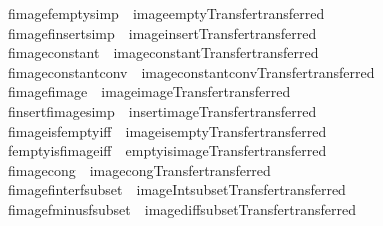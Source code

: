\begin{isabellebody}
\isamarkupfalse%
\ fimage{\isacharunderscore}fempty{\isacharbrackleft}simp{\isacharbrackright}\ {\isacharequal}\ image{\isacharunderscore}empty{\isacharbrackleft}Transfer{\isachardot}transferred{\isacharbrackright}\isanewline
{}\isamarkupfalse%
\ fimage{\isacharunderscore}finsert{\isacharbrackleft}simp{\isacharbrackright}\ {\isacharequal}\ image{\isacharunderscore}insert{\isacharbrackleft}Transfer{\isachardot}transferred{\isacharbrackright}\isanewline
{}\isamarkupfalse%
\ fimage{\isacharunderscore}constant\ {\isacharequal}\ image{\isacharunderscore}constant{\isacharbrackleft}Transfer{\isachardot}transferred{\isacharbrackright}\isanewline
{}\isamarkupfalse%
\ fimage{\isacharunderscore}constant{\isacharunderscore}conv\ {\isacharequal}\ image{\isacharunderscore}constant{\isacharunderscore}conv{\isacharbrackleft}Transfer{\isachardot}transferred{\isacharbrackright}\isanewline
{}\isamarkupfalse%
\ fimage{\isacharunderscore}fimage\ {\isacharequal}\ image{\isacharunderscore}image{\isacharbrackleft}Transfer{\isachardot}transferred{\isacharbrackright}\isanewline
{}\isamarkupfalse%
\ finsert{\isacharunderscore}fimage{\isacharbrackleft}simp{\isacharbrackright}\ {\isacharequal}\ insert{\isacharunderscore}image{\isacharbrackleft}Transfer{\isachardot}transferred{\isacharbrackright}\isanewline
{}\isamarkupfalse%
\ fimage{\isacharunderscore}is{\isacharunderscore}fempty{\isacharbrackleft}iff{\isacharbrackright}\ {\isacharequal}\ image{\isacharunderscore}is{\isacharunderscore}empty{\isacharbrackleft}Transfer{\isachardot}transferred{\isacharbrackright}\isanewline
{}\isamarkupfalse%
\ fempty{\isacharunderscore}is{\isacharunderscore}fimage{\isacharbrackleft}iff{\isacharbrackright}\ {\isacharequal}\ empty{\isacharunderscore}is{\isacharunderscore}image{\isacharbrackleft}Transfer{\isachardot}transferred{\isacharbrackright}\isanewline
{}\isamarkupfalse%
\ fimage{\isacharunderscore}cong\ {\isacharequal}\ image{\isacharunderscore}cong{\isacharbrackleft}Transfer{\isachardot}transferred{\isacharbrackright}\isanewline
{}\isamarkupfalse%
\ fimage{\isacharunderscore}finter{\isacharunderscore}fsubset\ {\isacharequal}\ image{\isacharunderscore}Int{\isacharunderscore}subset{\isacharbrackleft}Transfer{\isachardot}transferred{\isacharbrackright}\isanewline
{}\isamarkupfalse%
\ fimage{\isacharunderscore}fminus{\isacharunderscore}fsubset\ {\isacharequal}\ image{\isacharunderscore}diff{\isacharunderscore}subset{\isacharbrackleft}Transfer{\isachardot}transferred{\isacharbrackright}\isanewline

\end{isabellebody}
